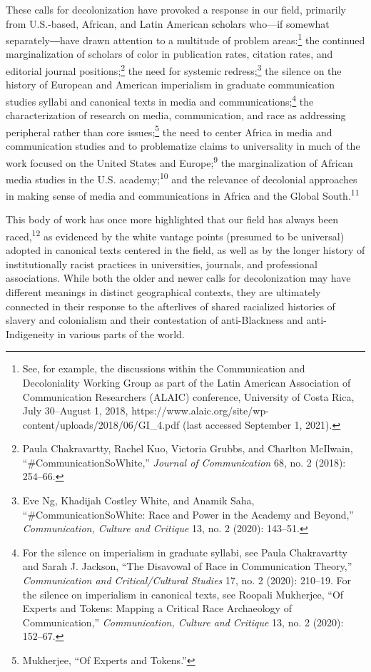 \documentclass{tufte-handout}
\begin{document}
These calls for decolonization have provoked a response in our field,
primarily from U.S.-based, African, and Latin American scholars who---if
somewhat separately―have drawn attention to a multitude of problem
areas:\footnote{See, for example, the discussions within the
  Communication and Decoloniality Working Group as part of the Latin
  American Association of Communication Researchers (ALAIC) conference,
  University of Costa Rica, July 30--August 1, 2018,
  https://www.alaic.org/site/wp-content/uploads/2018/06/GI\_4.pdf (last
  accessed September 1, 2021).} the continued marginalization of
scholars of color in publication rates, citation rates, and editorial
journal positions;\footnote{Paula Chakravartty, Rachel Kuo, Victoria
  Grubbs, and Charlton McIlwain, ``\#CommunicationSoWhite,''
  \emph{Journal of Communication} 68, no. 2 (2018): 254--66.} the need
for systemic redress;\footnote{Eve Ng, Khadijah Costley White, and
  Anamik Saha, ``\#CommunicationSoWhite: Race and Power in the Academy
  and Beyond,'' \emph{Communication, Culture and Critique} 13, no. 2
  (2020): 143--51.} the silence on the history of European and American
imperialism in graduate communication studies syllabi and canonical
texts in media and communications;\footnote{For the silence on
  imperialism in graduate syllabi, see Paula Chakravartty and Sarah J.
  Jackson, ``The Disavowal of Race in Communication Theory,''
  \emph{Communication and Critical/Cultural Studies} 17, no. 2 (2020):
  210--19. For the silence on imperialism in canonical texts, see
  Roopali Mukherjee, ``Of Experts and Tokens: Mapping a Critical Race
  Archaeology of Communication,'' \emph{Communication, Culture and
  Critique} 13, no. 2 (2020): 152--67.} the characterization of research
on media, communication, and race as addressing peripheral rather than
core issues;\footnote{Mukherjee, ``Of Experts and Tokens.''} the need to
center Africa in media and communication studies and to problematize
claims to universality in much of the work focused on the United States
and Europe;\textsuperscript{9}
the marginalization of African media studies in the U.S.
academy;\textsuperscript{10} and the relevance of decolonial approaches in making
sense of media and communications in Africa and the Global
South.\textsuperscript{11}

This body of work has once more highlighted that our field has always
been raced,\textsuperscript{12} as
evidenced by the white vantage points (presumed to be universal) adopted
in canonical texts centered in the field, as well as by the longer
history of institutionally racist practices in universities, journals,
and professional associations. While both the older and newer calls for
decolonization may have different meanings in distinct geographical
contexts, they are ultimately connected in their response to the
afterlives of shared racialized histories of slavery and colonialism and
their contestation of anti-Blackness and anti-Indigeneity in various
parts of the world.
\end{document}
